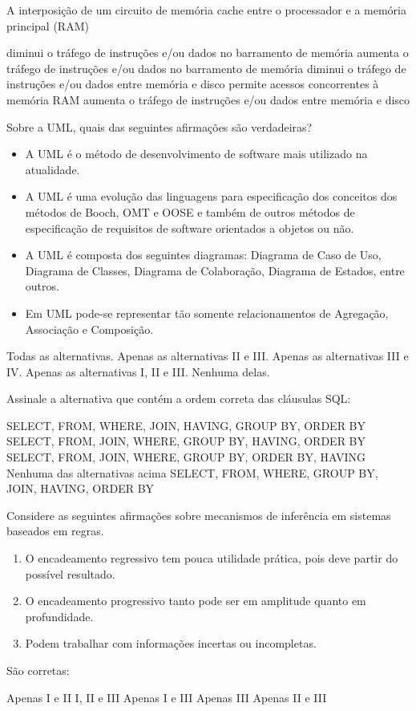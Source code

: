 \documentclass[12pt, addpoints]{exam}
\begin{document}
\begin{questions}
\question
A interposição de um circuito de memória cache entre o processador e a memória principal (RAM)
\begin{choices}
\choice diminui o tráfego de instruções e/ou dados no barramento de memória
\choice aumenta o tráfego de instruções e/ou dados no barramento de memória
\choice diminui o tráfego de instruções e/ou dados entre memória e disco
\choice permite acessos concorrentes à memória RAM
\choice aumenta o tráfego de instruções e/ou dados entre memória e disco
\end{choices}

\question
Sobre a UML, quais das seguintes afirmações são verdadeiras?

\begin{itemize}
    \item[I)] A UML é o método de desenvolvimento de software mais utilizado na atualidade.
    \item[II)] A UML é uma evolução das linguagens para especificação dos conceitos dos métodos de Booch, OMT e OOSE e também de outros métodos de especificação de requisitos de software orientados a objetos ou não.
    \item[III)] A UML é composta dos seguintes diagramas: Diagrama de Caso de Uso, Diagrama de Classes, Diagrama de Colaboração, Diagrama de Estados, entre outros.
    \item[IV)] Em UML pode-se representar tão somente relacionamentos de Agregação, Associação e Composição.
\end{itemize}
\begin{choices}
\choice Todas as alternativas.
\choice Apenas as alternativas II e III.
\choice Apenas as alternativas III e IV.
\choice Apenas as alternativas I, II e III.
\choice Nenhuma delas.
\end{choices}

\question
Assinale a alternativa que contém a ordem correta das cláusulas SQL:

\begin{choices}
\choice SELECT, FROM, WHERE, JOIN, HAVING, GROUP BY, ORDER BY
\choice SELECT, FROM, JOIN, WHERE, GROUP BY, HAVING, ORDER BY
\choice SELECT, FROM, JOIN, WHERE, GROUP BY, ORDER BY, HAVING
\choice Nenhuma das alternativas acima
\choice SELECT, FROM, WHERE, GROUP BY, JOIN, HAVING, ORDER BY
\end{choices}

\question
Considere as seguintes afirmações sobre mecanismos de inferência em sistemas baseados em regras.
\begin{enumerate}[label=\Roman*.]
    \item O encadeamento regressivo tem pouca utilidade prática, pois deve partir do possível resultado.
    \item O encadeamento progressivo tanto pode ser em amplitude quanto em profundidade.
    \item Podem trabalhar com informações incertas ou incompletas. 
\end{enumerate}
São corretas:
\begin{choices}
\choice Apenas I e II
\choice I, II e III
\choice Apenas I e III
\choice Apenas III
\choice Apenas II e III
\end{choices}


\end{questions}
\end{document}
